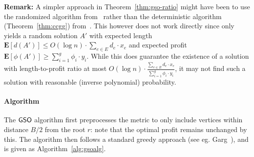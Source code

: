 \documentclass[11pt]{article}
\newcommand{\profit}{\phi}
\def\E{\mathbf{E}}
\def\gso{\ensuremath{{\sf GSO}}\xspace}
\begin{document}
\noindent
{\bf Remark:} A simpler approach in Theorem~\ref{thm:gso-ratio} might have been  to use the randomized algorithm from~\cite{gkr} rather than the deterministic algorithm (Theorem~\ref{thm:ccgg}) from~\cite{ccgg}. This however does not work directly since \cite{gkr} only yields a random solution $A'$ with  expected length $\E[d(A')] \le O(\log n)\cdot  \sum_{e\in E} d_e\cdot x_e$ and   expected profit $\E[\phi(A')]\ge  \sum_{i=1}^g \profit_i\cdot y_i$. While this does guarantee the existence of a solution with length-to-profit ratio at most $O(\log n)\cdot \frac{\sum_{e\in E} d_e\cdot x_e}{\sum_{i=1}^g \profit_i\cdot y_i}$, it may not find such a solution with reasonable (inverse polynomial) probability. 

\paragraph{Algorithm}
The \gso algorithm first preprocesses the metric to only include  vertices within distance $B/2$ from the root $r$: note that the optimal profit remains unchanged by this.   The algorithm then follows a standard greedy approach (see
  eg. Garg~\cite{garg0}), and is given as Algorithm~\ref{alg:gsoalg}. 
  
\end{document}
